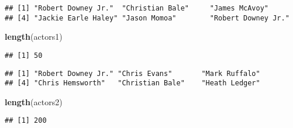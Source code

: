 \documentclass[]{article}
\newenvironment{Shaded}{\begin{snugshade}}{\end{snugshade}}
\newcommand{\KeywordTok}[1]{\textcolor[rgb]{0.13,0.29,0.53}{\textbf{#1}}}
\newcommand{\NormalTok}[1]{#1}
\newcommand{\OperatorTok}[1]{\textcolor[rgb]{0.81,0.36,0.00}{\textbf{#1}}}
\newcommand{\StringTok}[1]{\textcolor[rgb]{0.31,0.60,0.02}{#1}}
\begin{document}
\begin{Shaded}
\end{Shaded}

\begin{verbatim}
## [1] "Robert Downey Jr."  "Christian Bale"     "James McAvoy"      
## [4] "Jackie Earle Haley" "Jason Momoa"        "Robert Downey Jr."
\end{verbatim}

\begin{Shaded}
\begin{Highlighting}[]
\KeywordTok{length}\NormalTok{(actors1)}
\end{Highlighting}
\end{Shaded}

\begin{verbatim}
## [1] 50
\end{verbatim}

\begin{Shaded}
\end{Shaded}

\begin{verbatim}
## [1] "Robert Downey Jr." "Chris Evans"       "Mark Ruffalo"     
## [4] "Chris Hemsworth"   "Christian Bale"    "Heath Ledger"
\end{verbatim}

\begin{Shaded}
\begin{Highlighting}[]
\KeywordTok{length}\NormalTok{(actors2)}
\end{Highlighting}
\end{Shaded}

\begin{verbatim}
## [1] 200
\end{verbatim}
\end{document}
